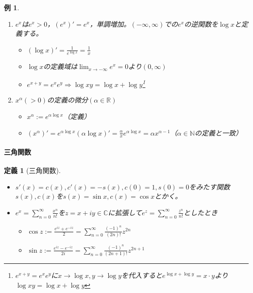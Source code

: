 \documentclass[dvipdfmx,a4j,10pt]{jsarticle}
\theoremstyle{mystyle1}
\newtheorem{example}[dfn]{例}
\theoremstyle{mystyle2}
\newtheorem{dfn*}{定義}
\begin{document}
\begin{example}　
    \begin{enumerate}
    \item $e^x$は$e^x>0$，$(e^x)'=e^x$，単調増加。$(-\infty , \infty)$での$e^x$の逆関数を$\log x$と定義する。
    \begin{itemize}
        \item $\displaystyle (\log x)'=\frac{1}{e^{\log x}}=\frac{1}{x}$
        \item $\log x$の定義域は$\displaystyle \lim_{x\to -\infty}e^x=0$より$(0,\infty)$
        \item $e^{x+y}=e^xe^y \Rightarrow \log{xy}=\log{x}+\log{y}$\footnote{$e^{x+y}=e^xe^y$に$x\to\log{x},y\to\log{y}$を代入すると$e^{\log{x}+\log{y}}=x\cdot y$より$\log{xy}=\log{x}+\log{y}$}
    \end{itemize}
    \item $x^\alpha(>0)$の定義の微分$(\alpha\in\mathbb{R})$
    \begin{itemize}
        \item $x^\alpha:=e^{\alpha\log{x}}$（定義）
        \item $(x^\alpha)'=e^{\alpha\log{x}}(\alpha\log{x})'=\frac{\alpha}{x}e^{\alpha\log{x}}=\alpha x^{\alpha-1}$（$\alpha\in\mathbb{N}$の定義と一致）
    \end{itemize}
    \end{enumerate}
\end{example}

\newpage

\paragraph{三角関数}
\begin{dfn*}[三角関数]\
    \vspace{-\baselineskip}
    \begin{itemize}
    \item $s'(x)=c(x),c'(x)=-s(x),c(0)=1,s(0)=0$をみたす関数$s(x),c(x)$を$s(x)=\sin{x},c(x)=\cos{x}$とかく。
    \item $\displaystyle e^x=\sum_{n=0}^{\infty}\frac{x^n}{n!}$を$z=x+iy\in\mathbb{C}$に拡張して$\displaystyle e^z=\sum_{n=0}^{\infty}\frac{z^n}{n!}$としたとき
    \begin{itemize}
    \item $\displaystyle\cos{z}:=\frac{e^{iz}+e^{-iz}}{2}=\sum_{n=0}^{\infty}\frac{(-1)^n}{(2n)!}z^{2n}$
    \item $\displaystyle\sin{z}:=\frac{e^{iz}-e^{-iz}}{2i}=\sum_{n=0}^{\infty}\frac{(-1)^n}{(2n+1)!}z^{2n+1}$
    \end{itemize}
    \end{itemize}
\end{dfn*}
\end{document}
